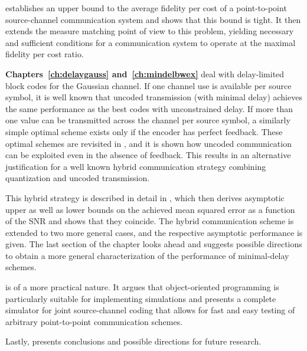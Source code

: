  establishes an upper bound to the average fidelity per cost
of a point-to-point source-channel communication system and shows that this
bound is tight. It then extends the measure matching point of view to this
problem, yielding necessary and sufficient conditions for a communication system
to operate at the maximal fidelity per cost ratio. 

\textbf{Chapters~\ref{ch:delaygauss} and~\ref{ch:mindelbwex}} deal with
delay-limited block codes for the Gaussian channel.  If one channel use is
available per source symbol, it is well known that uncoded transmission (with
minimal delay) achieves the same performance as the best codes with
unconstrained delay. If more than one value can be transmitted across the
channel per source symbol, a similarly simple optimal scheme exists only if the
encoder has perfect feedback.  These optimal schemes are revisited in
, and it is shown how uncoded communication can be
exploited even in the absence of feedback. This results in an alternative
justification for a well known hybrid communication strategy combining
quantization and uncoded transmission.

This hybrid strategy is described in detail in , which
then derives asymptotic upper as well as lower bounds on the achieved mean
squared error as a function of the SNR and shows that they coincide. The hybrid
communication scheme is extended to two more general cases, and the respective
asymptotic performance is given. The last section of the chapter looks ahead and
suggests possible directions to obtain a more general characterization of the
performance of minimal-delay schemes. 

 is of a more practical nature. It argues that
object-oriented programming is particularly suitable for implementing
simulations and presents a complete simulator for joint source-channel coding
that allows for fast and easy testing of arbitrary point-to-point communication
schemes. 

Lastly,  presents conclusions and possible directions for
future research.

